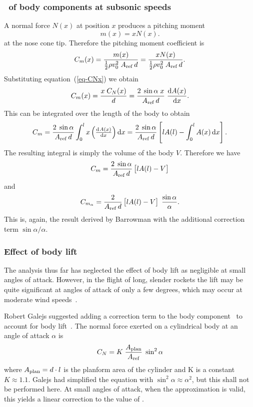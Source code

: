 \subsubsection{\Cma\ of body components at subsonic speeds}

A normal force $N(x)$ at position $x$ produces a pitching moment
%
\begin{equation}
m(x) = xN(x).
\end{equation}
%
at the nose cone tip.  Therefore the pitching moment coefficient is
%
\begin{equation}
C_m(x) = \frac{m(x)}{\frac{1}{2}\rho v_0^2\;A_{\rm ref}\, d}
       = \frac{xN(x)}{\frac{1}{2}\rho v_0^2\;A_{\rm ref}\, d}.
\end{equation}
%
Substituting equation~(\ref{eq-CNx}) we obtain
%
\begin{equation}
C_m(x) = \frac{x\;C_N(x)}{d}
       = \frac{2\; \sin\alpha\; x}{\Aref\, d}\; \frac{\dif A(x)}{\dif x}.
\end{equation}
%
This can be integrated over the length of the body to obtain
%
\begin{equation}
C_m = \frac{2\;\sin\alpha}{\Aref\,d}
        \int_0^l x \left(\od{A(x)}{x}\right) \dif x
    = \frac{2\;\sin\alpha}{\Aref\,d}
        \sbr{ lA(l)-\int_0^l A(x) \dif x }.
\end{equation}
%
The resulting integral is simply the volume of the body $V$.
Therefore we have
%
\begin{equation}
C_m = \frac{2\;\sin\alpha}{\Aref\,d} \sbr{ lA(l)-V }
\end{equation}
%
and
%
\begin{equation}
\Cma = \frac{2}{\Aref\,d}\sbr{ lA(l)-V }\; \frac{\sin\alpha}{\alpha}.
\label{eq-body-Cma}
\end{equation}
%
This is, again, the result derived by Barrowman with the additional
correction term $\sin\alpha/\alpha$.


\subsubsection{Effect of body lift}
\label{sec-body-lift}

The analysis thus far has neglected the effect of body lift as
negligible at small angles of attack.  However, in the flight of long,
slender rockets the lift may be quite significant at angles of attack
of only a few degrees, which may occur at moderate wind
speeds~\cite{galejs}.

Robert Galejs suggested adding a correction term to the body
component \CNa\ to account for body lift~\cite{galejs}.  The normal
force exerted on a cylindrical body at an angle of attack $\alpha$
is~\cite[p.~3-11]{hoerner}
%
\begin{equation}
C_N = K\; \frac{A_{\rm plan}}{A_{\rm ref}}\; \sin^2\alpha
\end{equation}
%
where $A_{\rm plan} = d\cdot l$ is the planform area of the cylinder
and K is a constant $K\approx 1.1$.  Galejs had simplified the
equation with $\sin^2\alpha\approx\alpha^2$, but this shall not be
performed here.  At small angles of attack, when the approximation is
valid, this yields a linear correction to the value of \CNa.

